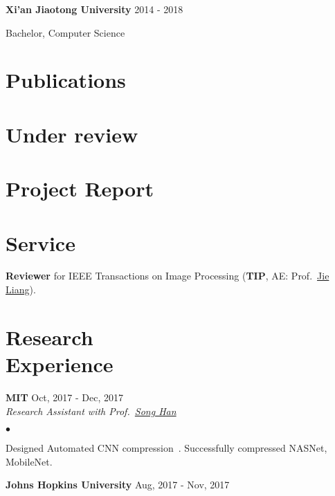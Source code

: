 \documentclass[margin,line]{res}
\newenvironment{list1}{
  \begin{list}{\ding{113}}{%
      \setlength{\itemsep}{0in}
      \setlength{\parsep}{0in} \setlength{\parskip}{0in}
      \setlength{\topsep}{0in} \setlength{\partopsep}{0in} 
      \setlength{\leftmargin}{0.17in}}}{\end{list}}
\newenvironment{list2}{
  \begin{list}{$\bullet$}{%
      \setlength{\itemsep}{0in}
      \setlength{\parsep}{0in} \setlength{\parskip}{0in}
      \setlength{\topsep}{0in} \setlength{\partopsep}{0in} 
      \setlength{\leftmargin}{0.2in}}}{\end{list}}
\begin{document}
\begin{resume}
{\bf Xi'an Jiaotong University} \hfill {2014 - 2018}\\
\vspace*{-.1in}
\begin{list1}
\item[] Bachelor, Computer Science %
\end{list1}



\section{\sc Publications}
\printbibliography[heading=none, type=inproceedings]

\section{\sc Under review}
\printbibliography[heading=none, type=article]

\section{\sc Project Report}
\printbibliography[heading=none, type=misc]


\section{\sc Service}
{\bf Reviewer} for IEEE Transactions on Image Processing (\textbf{TIP}, AE: Prof.~\href{http://www.sfu.ca/~jiel/}{Jie Liang}).


\section{\sc Research \\Experience}
{\bf MIT} \hfill {Oct, 2017 - Dec, 2017}\\%

\vspace{-.3in}
{\em Research Assistant with Prof.~\href{https://stanford.edu/~songhan/}{Song Han}}
\begin{list2}
\item Designed Automated CNN compression~\cite{adc}. Successfully compressed NASNet, MobileNet.
\end{list2}

{\bf Johns Hopkins University} \hfill {Aug, 2017 - Nov, 2017}\\%


\end{resume}
\end{document}
